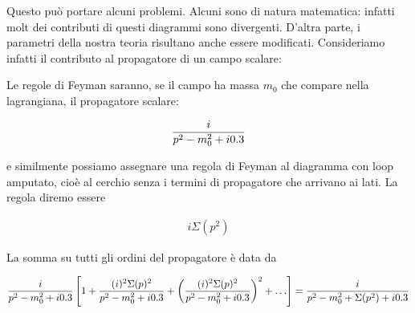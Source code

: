 \documentclass[11pt]{report}
\begin{document}
\begin{center}
\end{center}

Questo può portare alcuni problemi. Alcuni sono di natura matematica: infatti molt dei contributi di questi diagrammi sono divergenti. D'altra parte, i parametri della nostra teoria risultano anche essere modificati. Consideriamo infatti il contributo al propagatore di un campo scalare: 

Le regole di Feyman saranno, se il campo ha massa \(m_0\) che compare nella lagrangiana, il propagatore scalare:

\begin{align}
    \frac{i}{p^2-m_0^2 +i0.3}
\end{align}

e similmente possiamo assegnare una regola di Feyman al diagramma con loop amputato, cioè al cerchio senza i termini di propagatore che arrivano ai lati. La regola diremo essere 

\begin{align}
    i\Sigma(p^2)
\end{align}

La somma su tutti gli ordini del propagatore è data da 

\begin{align}
    \frac{i}{p^2 - m_0^2 +i0.3}\left[1 + \frac{(i)^2\Sigma(p)^2}{p^2 - m_0^2 + i0.3} + \left(\frac{(i)^2\Sigma(p)^2}{p^2 - m_0^2 + i0.3} \right)^2  + \ldots \right] = \frac{i}{p^2 - m_0^2 + \Sigma(p^2) + i0.3}
\end{align}
\end{document}
